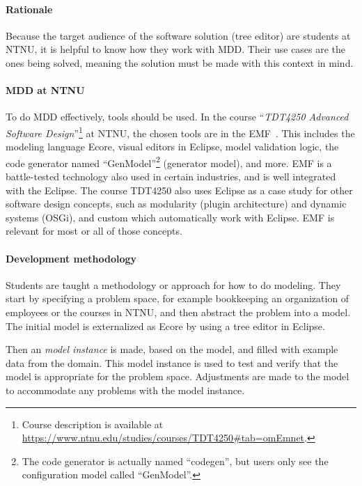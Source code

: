 \paragraph{Rationale}
Because the target audience of the software solution (tree editor) are students at \acrshort{NTNU}, it is helpful to know how they work with \acrlong{MDD}.
Their use cases are the ones being solved, meaning the solution must be made with this context in mind.

\paragraph{\Acrshort{MDD} at \acrshort{NTNU}}
To do \acrlong{MDD} effectively, tools should be used.
In the course ``\textit{\gls{TDT4250} Advanced Software Design}''\footnote{Course description is available at \href{https://www.ntnu.edu/studies/courses/TDT4250\#tab=omEmnet}{https://www.ntnu.edu/studies/courses/TDT4250\#tab=omEmnet}.} at \acrshort{NTNU}, the chosen tools are in the \acrfull{EMF}~\cite{hallvardtraettebergEMFTDT4250NTNU2017}.
This includes the modeling language \gls{Ecore}, visual editors in \gls{Eclipse}, model validation logic, the code generator named ``GenModel''\footnote{The code generator is actually named ``codegen'', but users only see the configuration model called ``GenModel''.} (generator model), and more.
\Acrshort{EMF} is a battle-tested technology also used in certain industries, and is well integrated with the \gls{Eclipse}.
The course \gls{TDT4250} also uses \gls{Eclipse} as a case study for other software design concepts, such as modularity (plugin architecture) and dynamic systems (OSGi), and custom  which automatically work with \gls{Eclipse}.
\Acrshort{EMF} is relevant for most or all of those concepts.

\paragraph{Development methodology}\label{par:tdt4250-methodology}
Students are taught a methodology or approach for how to do modeling.
They start by specifying a problem space, for example bookkeeping an organization of employees or the courses in \acrshort{NTNU}, and then abstract the problem into a model.
The initial model is externalized as \gls{Ecore} by using a tree editor in \gls{Eclipse}.


Then an \textit{model instance} is made, based on the model, and filled with example data from the domain.
This model instance is used to test and verify that the model is appropriate for the problem space.
Adjustments are made to the model to accommodate any problems with the model instance.



